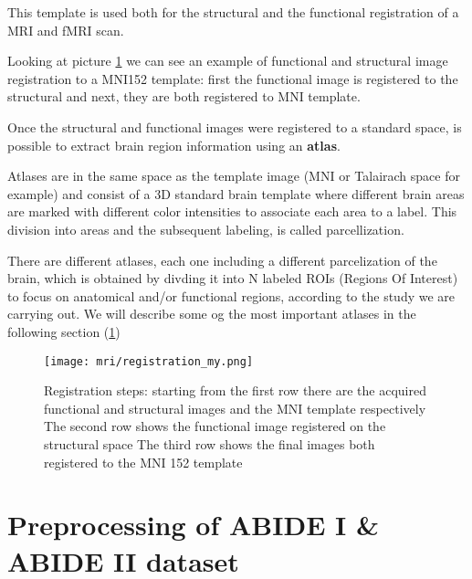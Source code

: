\documentclass[11pt]{report}
\begin{document}
This template is used both for the structural and the functional registration of a MRI and fMRI scan.

Looking at picture \ref{fig:registrationchart} we can see an example of functional and structural image registration to a MNI152 template: first the functional image is registered to the structural and next, they are both registered to MNI template.

Once the structural and functional images were registered to a standard space, is possible to extract brain region information using an \textbf{atlas}.

Atlases are in the same space as the template image (MNI or Talairach space for example) and consist of a 3D standard brain template where different brain areas are marked with different color intensities to associate each area to a label.
This division into areas and the subsequent labeling, is called parcellization.

There are different atlases, each one including a different parcelization of the brain, which is obtained by divding it into N labeled ROIs
(Regions Of Interest) to focus on anatomical and/or functional regions, according to the study we are carrying out.
We will describe some og the most important atlases in the following section (\ref{sec:cpac})




\begin{figure}
\centering
\texttt{[image: mri/registration\_my.png]}
\caption{Registration steps:
 starting from the first row there are the acquired functional and structural images and the MNI template respectively
 The second row shows the functional image registered on the structural space
 The third row shows the final images both registered to the MNI 152 template
}
\label{fig:registrationchart}
\end{figure}



\section{Preprocessing of ABIDE I \& ABIDE II dataset}\label{sec:cpac}
\end{document}
